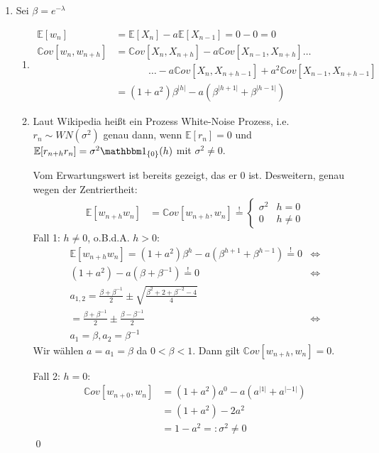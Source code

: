 \documentclass[a4paper,11pt,notitlepage,fullpage]{article}
\newcommand{\E}{\mathbb{E}}
\newcommand{\C}{\mathbb Cov}
\begin{document}
\begin{enumerate}
\item Sei $\beta = e^{-\lambda}$
\begin{enumerate}
\item
\begin{align*}
\E[w_n] &= \E[X_n] - a \E[X_{n-1}] = 0 - 0 = 0 \\
\C[w_n, w_{n+h}] &= \C[X_n, X_{n+h}] - a \C[X_{n-1}, X_{n+h}] \hdots \\
&\hspace{40pt} \hdots- a \C[X_n, X_{n+h-1}] + a^2 \C[X_{n-1}, X_{n+h-1}] \\
&= (1+a^2)\beta^{|h|} - a(\beta^{|h+1|} + \beta^{|h-1|})
\end{align*}
\item Laut Wikipedia heißt ein Prozess White-Noise Prozess, i.e. $r_n \sim WN(\sigma^2)$ genau dann, wenn $\E[r_n] = 0$ und $\E[r_{n+h}r_n] = \sigma^2 \mathbbm 1_{\{0\}}(h)$ mit $\sigma^2 \neq 0$.

Vom Erwartungswert ist bereits gezeigt, das er $0$ ist. Desweitern, genau wegen der Zentriertheit:
\begin{align*}
\E[w_{n+h}w_n] &= \C[w_{n+h}, w_n] \stackrel{!}{=} \begin{cases}
\sigma^2 &h=0 \\ 0 & h \neq 0
\end{cases}
\end{align*}
Fall 1: $h \neq 0$, o.B.d.A. $h > 0$:
\begin{align*}
\E[w_{n+h}w_n] = (1+a^2)\beta^{h} - a(\beta^{h+1} + \beta^{h-1}) \stackrel{!}{=} 0 &\Leftrightarrow \\
(1+a^2) - a(\beta + \beta^{-1}) \stackrel{!}{=} 0 &\Leftrightarrow \\
a_{1,2} = \frac{\beta + \beta^{-1}}{2} \pm \sqrt{\frac{\beta^2 + 2 + \beta^{-2} - 4}{4}} \\
= \frac{\beta + \beta^{-1}}{2} \pm \frac{\beta - \beta^{-1}}{2} &\Leftrightarrow \\
a_1 = \beta, a_2 = \beta^{-1}
\end{align*}
Wir wählen $a = a_1 = \beta$ da $0 < \beta < 1$. Dann gilt $\C[w_{n+h}, w_n] = 0$.

Fall 2: $h = 0$:
\begin{align*}
\C[w_{n+0}, w_n] &= (1+a^2) a^0 - a(a^{|1|} + a^{|-1|}) \\
&= (1+a^2) - 2a^2 \\
&= 1 - a^2 =: \sigma ^2 \neq 0
\end{align*}
\qed

\end{enumerate}


\end{enumerate}
\end{document}

